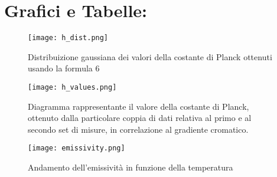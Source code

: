 \documentclass{article}
\begin{document}
\section{Grafici e Tabelle:}
\begin{figure}[h!]
    \centering
    \texttt{[image: h\_dist.png]}
    \caption{Distribuizione gaussiana dei valori della costante di Planck ottenuti usando la formula 6}
    \label{figura1}
\end{figure}
\begin{figure}[h!]
    \centering
    \texttt{[image: h\_values.png]}
    \caption{Diagramma rappresentante il valore della costante di Planck, ottenuto dalla particolare coppia di dati relativa al primo e al secondo set di misure, in correlazione al gradiente cromatico.}
    \label{figura1}
\end{figure}
\begin{figure}[h!]
    \centering
    \texttt{[image: emissivity.png]}
    \caption{Andamento dell'emissività in funzione della temperatura}
    \label{figura1}
\end{figure}
\end{document}
